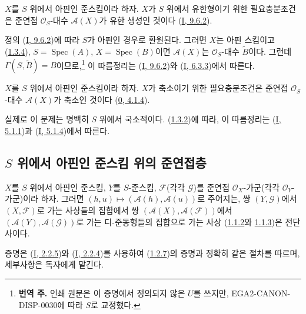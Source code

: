 \begin{env}[1.3.7]
\label{II.1.3.7-ko}
$X$를 $S$ 위에서 아핀인 준스킴이라 하자. $X$가 $S$ 위에서
유한형이기 위한 필요충분조건은 준연접 $\mathcal{O}_S$-대수
$\mathcal{A}(X)$가 유한 생성인 것이다
(\hyperref[I.9.6.2-ko]{I, 9.6.2}).
\end{env}

정의 (\hyperref[I.9.6.2-ko]{I, 9.6.2})에 따라 $S$가 아핀인
경우로 환원된다. 그러면 $X$는 아핀 스킴이고
(\hyperref[II.1.3.4-ko]{1.3.4}), $S=\operatorname{Spec}(A)$,
$X=\operatorname{Spec}(B)$이면 $\mathcal{A}(X)$는
$\mathcal{O}_S$-대수 $\widetilde{B}$이다. 그런데
$\Gamma(S,\widetilde{B})=B$이므로,\footnote{\textbf{번역 주.} 인쇄
원문은 이 증명에서 정의되지 않은 $U$를 쓰지만,
EGA2-CANON-DISP-0030에 따라 $S$로 교정했다.} 이 따름정리는
(\hyperref[I.9.6.2-ko]{I, 9.6.2})와
(\hyperref[I.6.3.3-ko]{I, 6.3.3})에서 따른다.

\begin{env}[1.3.8]
\label{II.1.3.8-ko}
$X$를 $S$ 위에서 아핀인 준스킴이라 하자. $X$가 축소이기 위한
필요충분조건은 준연접 $\mathcal{O}_S$-대수 $\mathcal{A}(X)$가
축소인 것이다
(\hyperref[0.4.1.4-ko]{0, 4.1.4}).
\end{env}

실제로 이 문제는 명백히 $S$ 위에서 국소적이다.
(\hyperref[II.1.3.2-ko]{1.3.2})에 따라, 이 따름정리는
(\hyperref[I.5.1.1-ko]{I, 5.1.1})과
(\hyperref[I.5.1.4-ko]{I, 5.1.4})에서 따른다.

\subsection{$S$ 위에서 아핀인 준스킴 위의 준연접층}
\label{subsection:II.1.4-ko}

\begin{env}[1.4.1]
\label{II.1.4.1-ko}
$X$를 $S$ 위에서 아핀인 준스킴, $Y$를 $S$-준스킴,
$\mathcal{F}$(각각 $\mathcal{G}$)를 준연접
$\mathcal{O}_X$-가군(각각 $\mathcal{O}_Y$-가군)이라 하자. 그러면
$(h,u)\mapsto(\mathcal{A}(h),\mathcal{A}(u))$로 주어지는, 쌍
$(Y,\mathcal{G})$에서 $(X,\mathcal{F})$로 가는 사상들의 집합에서 쌍
$(\mathcal{A}(X),\mathcal{A}(\mathcal{F}))$에서
$(\mathcal{A}(Y),\mathcal{A}(\mathcal{G}))$로 가는 디-준동형들의
집합으로 가는 사상
(\hyperref[II.1.1.2-ko]{1.1.2}와
\hyperref[II.1.1.3-ko]{1.1.3})은 전단사이다.
\end{env}

증명은 (\hyperref[I.2.2.5-ko]{I, 2.2.5})와
(\hyperref[I.2.2.4-ko]{I, 2.2.4})를 사용하여
(\hyperref[II.1.2.7-ko]{1.2.7})의 증명과 정확히 같은 절차를 따르며,
세부사항은 독자에게 맡긴다.

